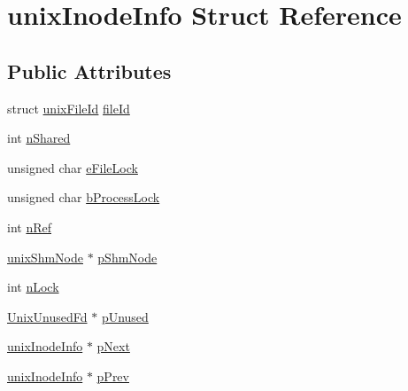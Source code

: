 \hypertarget{structunix_inode_info}{\section{unix\-Inode\-Info Struct Reference}
\label{structunix_inode_info}
}
\subsection*{Public Attributes}
\begin{DoxyCompactItemize}
\item 
struct \hyperlink{structunix_file_id}{unix\-File\-Id} \hyperlink{structunix_inode_info_ae692731d449f4462a921dda9a061faa6}{file\-Id}
\item 
int \hyperlink{structunix_inode_info_a0d7f8dd92964f53e59c8d741dbe00a61}{n\-Shared}
\item 
unsigned char \hyperlink{structunix_inode_info_a010a765bb3feecb16b650f68fc3a3c1f}{e\-File\-Lock}
\item 
unsigned char \hyperlink{structunix_inode_info_ade689e4231dd80bb33c86da1e5ed1586}{b\-Process\-Lock}
\item 
int \hyperlink{structunix_inode_info_a65cbd1fd05ed00f03a252266b04a8221}{n\-Ref}
\item 
\hyperlink{structunix_shm_node}{unix\-Shm\-Node} $\ast$ \hyperlink{structunix_inode_info_a302a8b82e27d5b3624ec122bc9c2ed61}{p\-Shm\-Node}
\item 
int \hyperlink{structunix_inode_info_a477f3357a32adbc1a9b05017e535444d}{n\-Lock}
\item 
\hyperlink{struct_unix_unused_fd}{Unix\-Unused\-Fd} $\ast$ \hyperlink{structunix_inode_info_a0dda9ad35734fa161d1f0b13b671c1c6}{p\-Unused}
\item 
\hyperlink{structunix_inode_info}{unix\-Inode\-Info} $\ast$ \hyperlink{structunix_inode_info_a80181ba4ef71dd0d8e55e97baedc761e}{p\-Next}
\item 
\hyperlink{structunix_inode_info}{unix\-Inode\-Info} $\ast$ \hyperlink{structunix_inode_info_a6575edce9898b48870c6f48047c01d01}{p\-Prev}
\end{DoxyCompactItemize}


